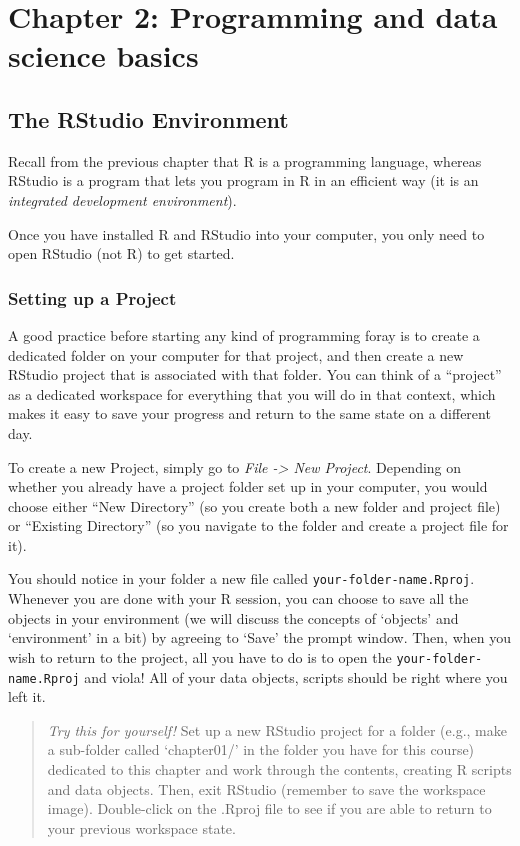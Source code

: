 \documentclass[
]{book}
\begin{document}
\chapter{Chapter 2: Programming and data science basics}\label{ch2}

\section{The RStudio Environment}\label{the-rstudio-environment}

Recall from the previous chapter that R is a programming language, whereas RStudio is a program that lets you program in R in an efficient way (it is an \emph{integrated development environment}).

Once you have installed R and RStudio into your computer, you only need to open RStudio (not R) to get started.

\subsection{Setting up a Project}\label{setting-up-a-project}

A good practice before starting any kind of programming foray is to create a dedicated folder on your computer for that project, and then create a new RStudio project that is associated with that folder. You can think of a ``project'' as a dedicated workspace for everything that you will do in that context, which makes it easy to save your progress and return to the same state on a different day.

To create a new Project, simply go to \emph{File -\textgreater{} New Project}. Depending on whether you already have a project folder set up in your computer, you would choose either ``New Directory'' (so you create both a new folder and project file) or ``Existing Directory'' (so you navigate to the folder and create a project file for it).

You should notice in your folder a new file called \texttt{your-folder-name.Rproj}. Whenever you are done with your R session, you can choose to save all the objects in your environment (we will discuss the concepts of `objects' and `environment' in a bit) by agreeing to `Save' the prompt window. Then, when you wish to return to the project, all you have to do is to open the \texttt{your-folder-name.Rproj} and viola! All of your data objects, scripts should be right where you left it.

\begin{quote}
\emph{Try this for yourself!} Set up a new RStudio project for a folder (e.g., make a sub-folder called `chapter01/' in the folder you have for this course) dedicated to this chapter and work through the contents, creating R scripts and data objects. Then, exit RStudio (remember to save the workspace image). Double-click on the .Rproj file to see if you are able to return to your previous workspace state.
\end{quote}
\end{document}
